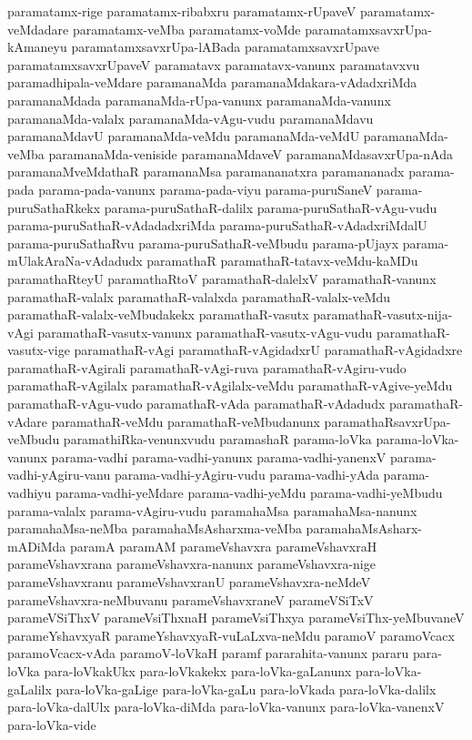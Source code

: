 {paramatamx-rige
paramatamx-ribabxru
paramatamx-rUpaveV
paramatamx-veMdadare
paramatamx-veMba
paramatamx-voMde
paramatamxsavxrUpa-kAmaneyu
paramatamxsavxrUpa-lABada
paramatamxsavxrUpave
paramatamxsavxrUpaveV
paramatavx
paramatavx-vanunx
paramatavxvu
paramadhipala-veMdare
paramanaMda
paramanaMdakara-vAdadxriMda
paramanaMdada
paramanaMda-rUpa-vanunx
paramanaMda-vanunx
paramanaMda-valalx
paramanaMda-vAgu-vudu
paramanaMdavu
paramanaMdavU
paramanaMda-veMdu
paramanaMda-veMdU
paramanaMda-veMba
paramanaMda-veniside
paramanaMdaveV
paramanaMdasavxrUpa-nAda
paramanaMveMdathaR
paramanaMsa
paramananatxra
paramananadx
parama-pada
parama-pada-vanunx
parama-pada-viyu
parama-puruSaneV
parama-puruSathaRkekx
parama-puruSathaR-dalilx
parama-puruSathaR-vAgu-vudu
parama-puruSathaR-vAdadadxriMda
parama-puruSathaR-vAdadxriMdalU
parama-puruSathaRvu
parama-puruSathaR-veMbudu
parama-pUjayx
parama-mUlakAraNa-vAdadudx
paramathaR
paramathaR-tatavx-veMdu-kaMDu
paramathaRteyU
paramathaRtoV
paramathaR-dalelxV
paramathaR-vanunx
paramathaR-valalx
paramathaR-valalxda
paramathaR-valalx-veMdu
paramathaR-valalx-veMbudakekx
paramathaR-vasutx
paramathaR-vasutx-nija-vAgi
paramathaR-vasutx-vanunx
paramathaR-vasutx-vAgu-vudu
paramathaR-vasutx-vige
paramathaR-vAgi
paramathaR-vAgidadxrU
paramathaR-vAgidadxre
paramathaR-vAgirali
paramathaR-vAgi-ruva
paramathaR-vAgiru-vudo
paramathaR-vAgilalx
paramathaR-vAgilalx-veMdu
paramathaR-vAgive-yeMdu
paramathaR-vAgu-vudo
paramathaR-vAda
paramathaR-vAdadudx
paramathaR-vAdare
paramathaR-veMdu
paramathaR-veMbudanunx
paramathaRsavxrUpa-veMbudu
paramathiRka-venunxvudu
paramashaR
parama-loVka
parama-loVka-vanunx
parama-vadhi
parama-vadhi-yanunx
parama-vadhi-yanenxV
parama-vadhi-yAgiru-vanu
parama-vadhi-yAgiru-vudu
parama-vadhi-yAda
parama-vadhiyu
parama-vadhi-yeMdare
parama-vadhi-yeMdu
parama-vadhi-yeMbudu
parama-valalx
parama-vAgiru-vudu
paramahaMsa
paramahaMsa-nanunx
paramahaMsa-neMba
paramahaMsAsharxma-veMba
paramahaMsAsharx-mADiMda
paramA
paramAM
parameVshavxra
parameVshavxraH
parameVshavxrana
parameVshavxra-nanunx
parameVshavxra-nige
parameVshavxranu
parameVshavxranU
parameVshavxra-neMdeV
parameVshavxra-neMbuvanu
parameVshavxraneV
parameVSiTxV
parameVSiThxV
parameVsiThxnaH
parameVsiThxya
parameVsiThx-yeMbuvaneV
parameYshavxyaR
parameYshavxyaR-vuLaLxva-neMdu
paramoV
paramoVcacx
paramoVcacx-vAda
paramoV-loVkaH
paramf
pararahita-vanunx
pararu
para-loVka
para-loVkakUkx
para-loVkakekx
para-loVka-gaLanunx
para-loVka-gaLalilx
para-loVka-gaLige
para-loVka-gaLu
para-loVkada
para-loVka-dalilx
para-loVka-dalUlx
para-loVka-diMda
para-loVka-vanunx
para-loVka-vanenxV
para-loVka-vide
}
